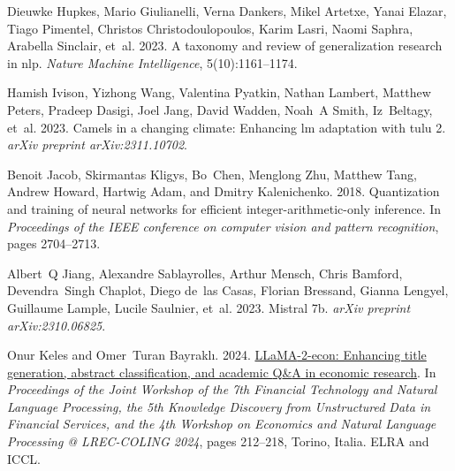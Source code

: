 \documentclass[11pt]{article}
\begin{document}
\begin{thebibliography}{88}
    Dieuwke Hupkes, Mario Giulianelli, Verna Dankers, Mikel Artetxe, Yanai Elazar, Tiago Pimentel, Christos Christodoulopoulos, Karim Lasri, Naomi Saphra, Arabella Sinclair, et~al. 2023.
    \newblock A taxonomy and review of generalization research in nlp.
    \newblock \emph{Nature Machine Intelligence}, 5(10):1161--1174.
    
    Hamish Ivison, Yizhong Wang, Valentina Pyatkin, Nathan Lambert, Matthew Peters, Pradeep Dasigi, Joel Jang, David Wadden, Noah~A Smith, Iz~Beltagy, et~al. 2023.
    \newblock Camels in a changing climate: Enhancing lm adaptation with tulu 2.
    \newblock \emph{arXiv preprint arXiv:2311.10702}.
    
    Benoit Jacob, Skirmantas Kligys, Bo~Chen, Menglong Zhu, Matthew Tang, Andrew Howard, Hartwig Adam, and Dmitry Kalenichenko. 2018.
    \newblock Quantization and training of neural networks for efficient integer-arithmetic-only inference.
    \newblock In \emph{Proceedings of the IEEE conference on computer vision and pattern recognition}, pages 2704--2713.
    
    Albert~Q Jiang, Alexandre Sablayrolles, Arthur Mensch, Chris Bamford, Devendra~Singh Chaplot, Diego de~las Casas, Florian Bressand, Gianna Lengyel, Guillaume Lample, Lucile Saulnier, et~al. 2023.
    \newblock Mistral 7b.
    \newblock \emph{arXiv preprint arXiv:2310.06825}.
    
    Onur Keles and Omer~Turan Bayrakl{\i}. 2024.
    \newblock \href {https://aclanthology.org/2024.finnlp-1.21} {{LL}a{MA}-2-econ: Enhancing title generation, abstract classification, and academic {Q}{\&}{A} in economic research}.
    \newblock In \emph{Proceedings of the Joint Workshop of the 7th Financial Technology and Natural Language Processing, the 5th Knowledge Discovery from Unstructured Data in Financial Services, and the 4th Workshop on Economics and Natural Language Processing @ LREC-COLING 2024}, pages 212--218, Torino, Italia. ELRA and ICCL.
    

\end{thebibliography}
\end{document}
